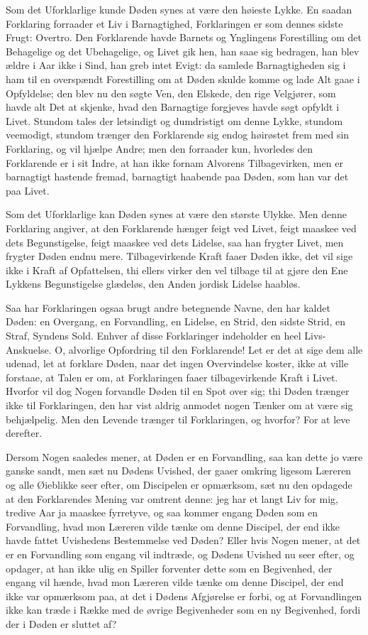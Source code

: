 \documentclass[12pt,a4paper]{article}
\begin{document}
Som det Uforklarlige kunde Døden synes at være den høieste Lykke. En saadan Forklaring forraader et Liv i Barnagtighed, Forklaringen er som dennes sidste Frugt: Overtro. Den Forklarende havde Barnets og Ynglingens Forestilling om det Behagelige og det Ubehagelige, og Livet gik hen, han saae sig bedragen, han blev ældre i Aar ikke i Sind, han greb intet Evigt: da samlede Barnagtigheden sig i ham til en overspændt Forestilling om at Døden skulde komme og lade Alt gaae i Opfyldelse; den blev nu den søgte Ven, den Elskede, den rige Velgjører, som havde alt Det at skjenke, hvad den Barnagtige forgjeves havde søgt opfyldt i Livet. Stundom tales der letsindigt og dumdristigt om denne Lykke, stundom veemodigt, stundom trænger den Forklarende sig endog høirøstet frem med sin Forklaring, og vil hjælpe Andre; men den forraader kun, hvorledes den Forklarende er i sit Indre, at han ikke fornam Alvorens Tilbagevirken, men er barnagtigt hastende fremad, barnagtigt haabende paa Døden, som han var det paa Livet.

Som det Uforklarlige kan Døden synes at være den største Ulykke. Men denne Forklaring angiver, at den Forklarende hænger feigt ved Livet, feigt maaskee ved dets Begunstigelse, feigt maaskee ved dets Lidelse, saa han frygter Livet, men frygter Døden endnu mere. Tilbagevirkende Kraft faaer Døden ikke, det vil sige ikke i Kraft af Opfattelsen, thi ellers virker den vel tilbage til at gjøre den Ene Lykkens Begunstigelse glædeløs, den Anden jordisk Lidelse haabløs.

Saa har Forklaringen ogsaa brugt andre betegnende Navne, den har kaldet Døden: en Overgang, en Forvandling, en Lidelse, en Strid, den sidste Strid, en Straf, Syndens Sold. Enhver af disse Forklaringer indeholder en heel Livs-Anskuelse. O, alvorlige Opfordring til den Forklarende! Let er det at sige dem alle udenad, let at forklare Døden, naar det ingen Overvindelse koster, ikke at ville forstaae, at Talen er om, at Forklaringen faaer tilbagevirkende Kraft i Livet. Hvorfor vil dog Nogen forvandle Døden til en Spot over sig; thi Døden trænger ikke til Forklaringen, den har vist aldrig anmodet nogen Tænker om at være sig behjælpelig. Men den Levende trænger til Forklaringen, og hvorfor? For at leve derefter.

Dersom Nogen saaledes mener, at Døden er en Forvandling, saa kan dette jo være ganske sandt, men sæt nu Dødens Uvished, der gaaer omkring ligesom Læreren og alle Øieblikke seer efter, om Discipelen er opmærksom, sæt nu den opdagede at den Forklarendes Mening var omtrent denne: jeg har et langt Liv for mig, tredive Aar ja maaskee fyrretyve, og saa kommer engang Døden som en Forvandling, hvad mon Læreren vilde tænke om denne Discipel, der end ikke havde fattet Uvishedens Bestemmelse ved Døden? Eller hvis Nogen mener, at det er en Forvandling som engang vil indtræde, og Dødens Uvished nu seer efter, og opdager, at han ikke ulig en Spiller forventer dette som en Begivenhed, der engang vil hænde, hvad mon Læreren vilde tænke om denne Discipel, der end ikke var opmærksom paa, at det i Dødens Afgjørelse er forbi, og at Forvandlingen ikke kan træde i Række med de øvrige Begivenheder som en ny Begivenhed, fordi der i Døden er sluttet af?
\end{document}
